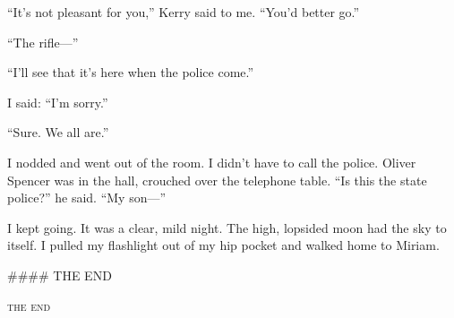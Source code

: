 {“It’s not pleasant for you,” Kerry said to me. “You’d better go.”

“The rifle—”

“I’ll see that it’s here when the police come.”

I said: “I’m sorry.”

“Sure. We all are.”

I nodded and went out of the room. I didn’t have to call the police. Oliver Spencer was in the hall, crouched over the telephone table. “Is this the state police?” he said. “My son—”

I kept going. It was a clear, mild night. The high, lopsided moon had the sky to itself. I pulled my flashlight out of my hip pocket and walked home to Miriam.

#### THE END 
}

\vspace{2\nbs}
\clearpage
\thispagestyle{empty}


\scenebreak
\scenebreak
{\centering\textsc{the end}\par}

\clearpage
